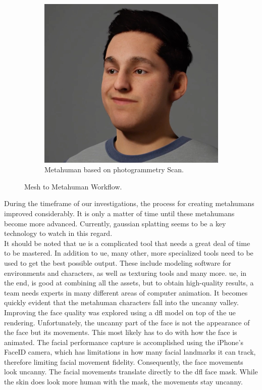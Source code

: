 \documentclass[
  a4paper,  %
  twoside,  %
  bibliography=totoc,
  headsepline,
  cleardoublepage=empty,
  parskip=half,
  draft=false
]{scrbook}
\begin{document}
\begin{figure}[h]
\begin{subfigure}[b]{0.5\textwidth}
    \includegraphics[width=\textwidth]{./graphics/unreal-engine/Metahuman.png}
    \caption{Metahuman based on photogrammetry Scan.}
    \label{fig:metahuman-result}
  \end{subfigure}
  \caption{Mesh to Metahuman Workflow.}
  \label{fig:metahuman-comp}
\end{figure}

During the timeframe of our investigations, the process for creating metahumans improved considerably. It is only a matter of time until these metahumans become more advanced. Currently, gaussian splatting seems to be a key technology to watch in this regard. \\
It should be noted that \gls{ue} is a complicated tool that needs a great deal of time to be mastered. In addition to \gls{ue}, many other, more specialized tools need to be used to get the best possible output. These include modeling software for environments and characters, as well as texturing tools and many more. \gls{ue}, in the end, is good at combining all the assets, but to obtain high-quality results, a team needs experts in many different areas of computer animation. It becomes quickly evident that the metahuman characters fall into the uncanny valley. Improving the face quality was explored using a \gls{dfl} model on top of the \gls{ue} rendering. Unfortunately, the uncanny part of the face is not the appearance of the face but its movements. This most likely has to do with how the face is animated. The facial performance capture is accomplished using the iPhone's FaceID camera, which has limitations in how many facial landmarks it can track, therefore limiting facial movement fidelity. Consequently, the face movements look uncanny. The facial movements translate directly to the \gls{dfl} face mask. While the skin does look more human with the mask, the movements stay uncanny.
\end{document}
